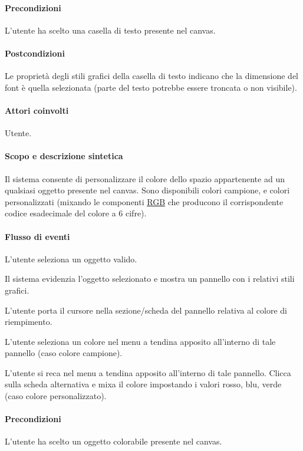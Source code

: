 \paragraph{Precondizioni}L'utente ha scelto una casella di testo presente nel canvas.
\paragraph{Postcondizioni}Le propriet\`a degli stili grafici della casella di testo indicano che la dimensione del font \` e quella selezionata (parte del testo potrebbe essere troncata o non visibile).

\paragraph{Attori coinvolti} Utente.
\paragraph{Scopo e descrizione sintetica}   Il sistema consente di personalizzare il colore dello spazio appartenente ad un qualsiasi oggetto presente nel canvas. Sono disponibili colori campione, e colori personalizzati (mixando le componenti \underline{RGB} che producono il corrispondente codice esadecimale del colore a 6 cifre).
\paragraph{Flusso di eventi}
\begin{elenconumerato}[\textbf{}]{\subsubsecindent}
\item L'utente seleziona un oggetto valido.
\item Il sistema evidenzia l'oggetto selezionato e mostra un pannello con i relativi stili grafici.
\item L'utente porta il cursore nella sezione/scheda del pannello relativa al colore di riempimento.
\item L'utente seleziona un colore nel menu a tendina apposito all'interno di tale pannello (caso colore campione).
\item L'utente si reca nel menu a tendina apposito all'interno di tale pannello. Clicca sulla scheda alternativa e mixa il colore impostando i valori rosso, blu, verde (caso colore personalizzato).
\end{elenconumerato}
\paragraph{Precondizioni}L'utente ha scelto un oggetto colorabile presente nel canvas.

